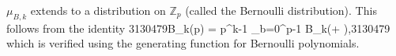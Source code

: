 $\mu_{B,k}$ extends to a distribution on $\mathbb{Z}_p$ (called the  Bernoulli distribution). This follows from the identity
3130479B_k(p\alpha) = p^{k-1} \sum_{b=0}^{p-1} B_k\left(\alpha + \right),3130479
which is verified using the generating function for Bernoulli polynomials.
